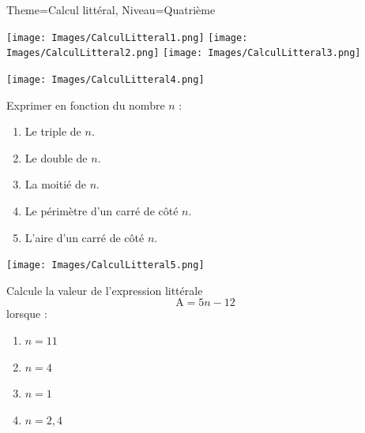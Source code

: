 \documentclass[11pt]{article}
\begin{document}
\begin{multicols}{2}

    \begin{Maquette}[Fiche]{Theme=Calcul littéral, Niveau=Quatrième}

        \begin{exercice}
            \texttt{[image: Images/CalculLitteral1.png]}
            \texttt{[image: Images/CalculLitteral2.png]}
            \texttt{[image: Images/CalculLitteral3.png]}
        \end{exercice}

        \begin{exercice}
            \begin{center}
                \texttt{[image: Images/CalculLitteral4.png]}
            \end{center}
        \end{exercice}

        \begin{exercice}[Titre=En fonction de …]
            Exprimer en fonction du nombre $n$ :
            \begin{enumerate}
                \item Le triple de $n$.
                \item Le double de $n$.
                \item La moitié de $n$.
                \item Le périmètre d’un carré de côté $n$.
                \item L’aire d’un carré de côté $n$.
            \end{enumerate}
        \end{exercice}

        \begin{exercice}
            \texttt{[image: Images/CalculLitteral5.png]}
        \end{exercice}

        \begin{exercice}
            Calcule la valeur de l’expression littérale
            \[
                \textrm{A} = 5 n - 12
            \]
            lorsque :
            \begin{enumerate}
                \item $n=11$
                \item $n=4$
                \item $n=1$
                \item $n=2,4$
            \end{enumerate}
        \end{exercice}


\end{Maquette}
\end{multicols}
\end{document}

